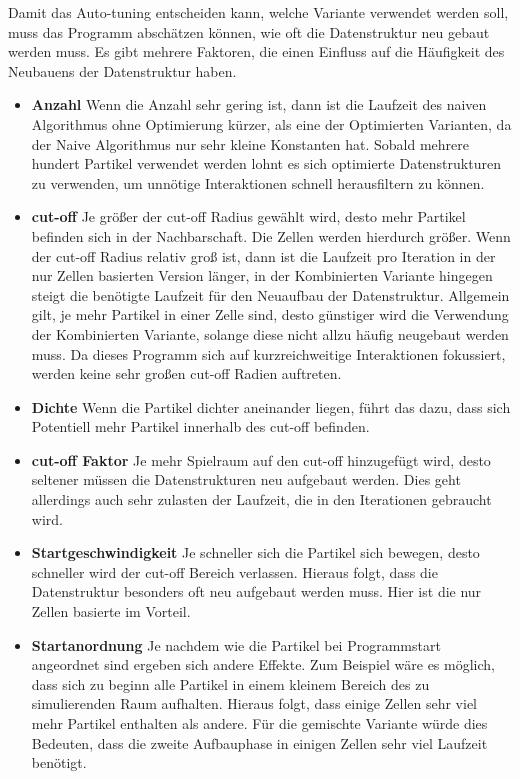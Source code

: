 \documentclass[
	12pt,
	a4paper,
	BCOR10mm,
	DIV14,
	headsepline,
]{scrreprt}
\begin{document}
Damit das Auto-tuning entscheiden kann, welche Variante verwendet werden soll, muss das Programm abschätzen können, wie oft die Datenstruktur neu gebaut werden muss. Es gibt mehrere Faktoren, die einen Einfluss auf die Häufigkeit des Neubauens der Datenstruktur haben.
\begin{itemize}
	\item \textbf{Anzahl} Wenn die Anzahl sehr gering ist, dann ist die Laufzeit des naiven Algorithmus ohne Optimierung kürzer, als eine der Optimierten Varianten, da der Naive Algorithmus nur sehr kleine Konstanten hat. Sobald mehrere hundert Partikel verwendet werden lohnt es sich optimierte Datenstrukturen zu verwenden, um unnötige Interaktionen schnell herausfiltern zu können.
	\item \textbf{cut-off} Je größer der cut-off Radius gewählt wird, desto mehr Partikel befinden sich in der Nachbarschaft. Die Zellen werden hierdurch größer. Wenn der cut-off Radius relativ groß ist, dann ist die Laufzeit pro Iteration in der nur Zellen basierten Version länger, in der Kombinierten Variante hingegen steigt die benötigte Laufzeit für den Neuaufbau der Datenstruktur. Allgemein gilt, je mehr Partikel in einer Zelle sind, desto günstiger wird die Verwendung der Kombinierten Variante, solange diese nicht allzu häufig neugebaut werden muss. Da dieses Programm sich auf kurzreichweitige Interaktionen fokussiert, werden keine sehr großen cut-off Radien auftreten.
	\item \textbf{Dichte} Wenn die Partikel dichter aneinander liegen, führt das dazu, dass sich Potentiell mehr Partikel innerhalb des cut-off befinden.
	\item \textbf{cut-off Faktor} Je mehr Spielraum auf den cut-off hinzugefügt wird, desto seltener müssen die Datenstrukturen neu aufgebaut werden. Dies geht allerdings auch sehr zulasten der Laufzeit, die in den Iterationen gebraucht wird.
	\item \textbf{Startgeschwindigkeit} Je schneller sich die Partikel sich bewegen, desto schneller wird der cut-off Bereich verlassen. Hieraus folgt, dass die Datenstruktur besonders oft neu aufgebaut werden muss. Hier ist die nur Zellen basierte im Vorteil.
	\item \textbf{Startanordnung} Je nachdem wie die Partikel bei Programmstart angeordnet sind ergeben sich andere Effekte. Zum Beispiel wäre es möglich, dass sich zu beginn alle Partikel in einem kleinem Bereich des zu simulierenden Raum aufhalten. Hieraus folgt, dass einige Zellen sehr viel mehr Partikel enthalten als andere. Für die gemischte Variante würde dies Bedeuten, dass die zweite Aufbauphase in einigen Zellen sehr viel Laufzeit benötigt.
\end{itemize}
\end{document}
